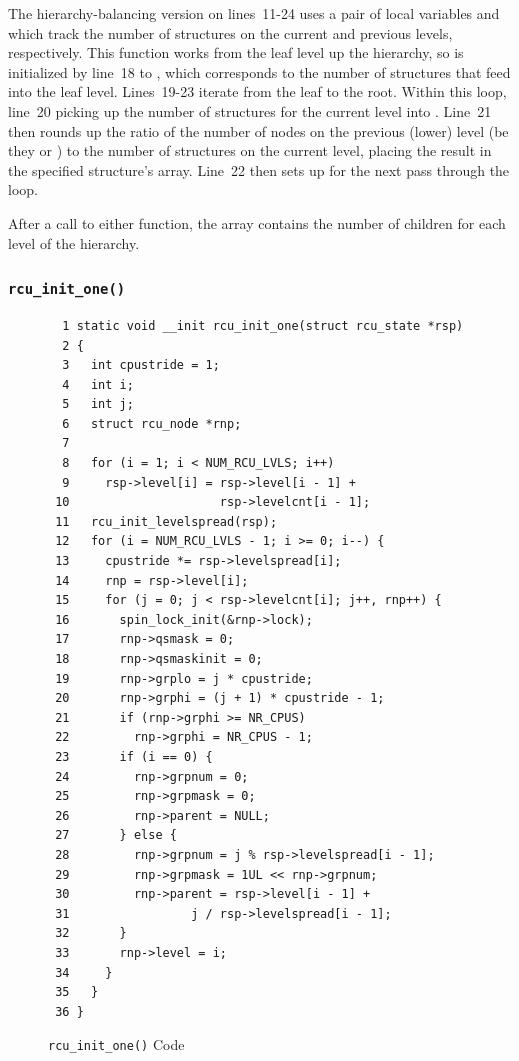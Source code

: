 The hierarchy-balancing version on lines~11-24
uses a pair of local variables  and  which track
the number of  structures on the current and previous
levels, respectively.
This function works from the leaf level up the hierarchy, so 
is initialized by line~18 to , which corresponds
to the number of  structures that feed into the leaf level.
Lines~19-23 iterate from the leaf to the root.
Within this loop, line~20 picking up
the number of  structures for the current level into
.
Line~21 then rounds up the ratio of the number of nodes on the previous
(lower) level (be they  or )
to the number of  structures on the current
level, placing the result in the specified  structure's
 array.
Line~22 then sets up for the next pass through the loop.

After a call to either function, the  array contains
the number of children for each level of the  hierarchy.

\subsubsection{\tt rcu\_init\_one()}
\label{app:rcuimpl:rcutreewt:rcu-init-one}

\begin{figure}[tbp]
{ \scriptsize
\begin{verbatim}
  1 static void __init rcu_init_one(struct rcu_state *rsp)
  2 {
  3   int cpustride = 1;
  4   int i;
  5   int j;
  6   struct rcu_node *rnp;
  7
  8   for (i = 1; i < NUM_RCU_LVLS; i++)
  9     rsp->level[i] = rsp->level[i - 1] +
 10                     rsp->levelcnt[i - 1];
 11   rcu_init_levelspread(rsp);
 12   for (i = NUM_RCU_LVLS - 1; i >= 0; i--) {
 13     cpustride *= rsp->levelspread[i];
 14     rnp = rsp->level[i];
 15     for (j = 0; j < rsp->levelcnt[i]; j++, rnp++) {
 16       spin_lock_init(&rnp->lock);
 17       rnp->qsmask = 0;
 18       rnp->qsmaskinit = 0;
 19       rnp->grplo = j * cpustride;
 20       rnp->grphi = (j + 1) * cpustride - 1;
 21       if (rnp->grphi >= NR_CPUS)
 22         rnp->grphi = NR_CPUS - 1;
 23       if (i == 0) {
 24         rnp->grpnum = 0;
 25         rnp->grpmask = 0;
 26         rnp->parent = NULL;
 27       } else {
 28         rnp->grpnum = j % rsp->levelspread[i - 1];
 29         rnp->grpmask = 1UL << rnp->grpnum;
 30         rnp->parent = rsp->level[i - 1] +
 31                 j / rsp->levelspread[i - 1];
 32       }
 33       rnp->level = i;
 34     }
 35   }
 36 }
\end{verbatim}
}
\caption{{\tt rcu\_init\_one()} Code}
\label{fig:app:rcuimpl:rcutreewt:Code for rcu-init-one}
\end{figure}

